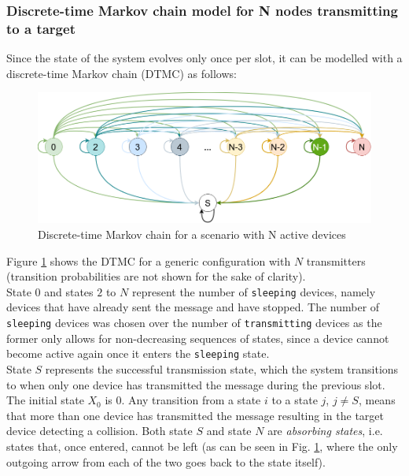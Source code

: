 \subsubsection{Discrete-time Markov chain model for N nodes transmitting to a target}
Since the state of the system evolves only once per slot, it can be modelled
with a discrete-time Markov chain (DTMC) as follows:
\begin{figure}[H]
    \begin{center}
        \includegraphics[scale=0.4]{img/DTMC.png}
        \caption{Discrete-time Markov chain for a scenario with N active devices}
        \label{fig:dtmc}
    \end{center}
\end{figure}
\noindent Figure \ref{fig:dtmc} shows the DTMC for a generic configuration with
$N$ transmitters (transition probabilities are not shown for the sake of clarity).\\
State $0$ and states $2$ to $N$ represent the number of \texttt{sleeping}
devices, namely devices that have already sent the message and have stopped. The number of \texttt{sleeping} devices was chosen over the number of \texttt{transmitting} devices as the former only allows for non-decreasing sequences of states, since a device cannot become active again once it enters the \texttt{sleeping} state.\\
State $S$ represents the successful transmission state, which the system
transitions to when only one device has transmitted the message during the
previous slot.\\
The initial state $X_{0}$ is $0$. Any transition from a state $i$ to a state
$j$, $j \neq S$, means that more than one device has transmitted the message 
resulting in the target device detecting a collision.
Both state $S$ and state $N$ are \textit{absorbing states}, i.e. states that,
once entered, cannot be left (as can be seen in Fig. \ref{fig:dtmc}, where the
only outgoing arrow from each of the two goes back to the state itself).\\
